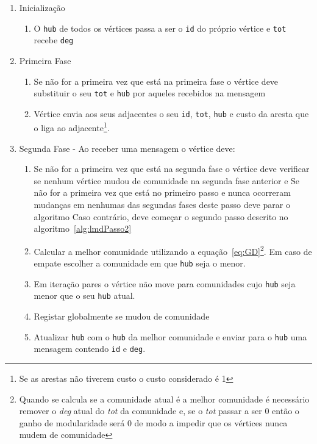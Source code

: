 \begin{algorithm}
\begin{minipage}{\textwidth}
\caption{Louvain \textit{Method} Distribuido Passo 1}
\label{alg:lmdPasso1}
\begin{enumerate}
  \item Inicialização
			\begin{enumerate}
				\item O \verb|hub| de todos os vértices passa a ser o \verb|id| do próprio vértice e \verb|tot| 				recebe \verb|deg|
			\end{enumerate}
	\item Primeira Fase
	\begin{enumerate}
	\item Se não for a primeira vez que está na primeira fase o vértice deve substituir o seu \verb|tot| e \verb|hub| por aqueles recebidos na mensagem
	\item Vértice envia aos seus adjacentes o seu \verb|id|, \verb|tot|, \verb|hub| e custo da aresta que o liga ao adjacente\footnote{Se as arestas não tiverem custo o custo considerado é 1}.
	\end{enumerate}
	
  \item Segunda Fase -  Ao receber uma mensagem o vértice deve:
  
		\begin{enumerate}
				\item Se não for a primeira vez que está na segunda fase o vértice deve verificar se nenhum vértice mudou de comunidade na segunda fase anterior e
						\subitem Se não for a primeira vez que está no primeiro passo e nunca ocorreram mudanças em nenhumas das segundas fases deste passo deve parar o algoritmo
						\subitem Caso contrário, deve começar o segundo passo descrito no algoritmo~\ref{alg:lmdPasso2}
				\item Calcular a melhor comunidade utilizando a equação~\ref{eq:GD}\footnote{Quando se calcula se a comunidade atual é a melhor comunidade é necessário remover o \textit{deg} atual do \textit{tot} da comunidade e, se o \textit{tot} passar a ser 0 então o ganho de modularidade será 0 de modo a impedir que os vértices nunca mudem de comunidade}. 
				Em caso de empate	escolher a comunidade em que \verb|hub| seja o menor.
				\label{prt:force}
				\item Em iteração pares o vértice não move para comunidades cujo \verb|hub| seja menor que o seu \verb|hub| atual.
				\item Registar globalmente se mudou de comunidade
				\item Atualizar \verb|hub| com o \verb|hub| da melhor comunidade e enviar para o \verb|hub| uma mensagem contendo \verb|id| e \verb|deg|.
		\end{enumerate}
		

\end{enumerate}
\end{minipage}
\end{algorithm}
